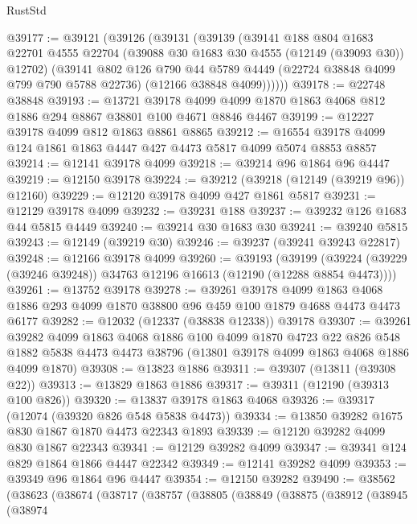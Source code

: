 \begin{lexlean}{RustStd}
\begin{coremodule}
@39177 := @39121
    (@39126
      (@39131
        (@39139
          (@39141
            @188
            @804
            @1683
            @22701
            @4555
            @22704
            (@39088 @30 @1683 @30 @4555 (@12149 (@39093 @30)) @12702)
            (@39141
              @802
              @126
              @790
              @44
              @5789
              @4449
              (@22724 @38848 @4099 @799 @790 @5788 @22736)
              (@12166 @38848 @4099))))))
@39178 := @22748 @38848
@39193 := @13721
    @39178
    @4099
    @4099
    @1870
    @1863
    @4068
    @812
    @1886
    @294
    @8867
    @38801
    @100
    @4671
    @8846
    @4467
@39199 := @12227 @39178 @4099 @812 @1863 @8861 @8865
@39212 := @16554 @39178 @4099 @124 @1861 @1863 @4447 @427 @4473 @5817 @4099 @5074 @8853 @8857
@39214 := @12141 @39178 @4099
@39218 := @39214 @96 @1864 @96 @4447
@39219 := @12150 @39178
@39224 := @39212 (@39218 (@12149 (@39219 @96)) @12160)
@39229 := @12120 @39178 @4099 @427 @1861 @5817
@39231 := @12129 @39178 @4099
@39232 := @39231 @188
@39237 := @39232 @126 @1683 @44 @5815 @4449
@39240 := @39214 @30 @1683 @30
@39241 := @39240 @5815
@39243 := @12149 (@39219 @30)
@39246 := @39237 (@39241 @39243 @22817)
@39248 := @12166 @39178 @4099
@39260 := @39193
    (@39199 (@39224 (@39229 (@39246 @39248)) @34763 @12196 @16613 (@12190 (@12288 @8854 @4473))))
@39261 := @13752 @39178
@39278 := @39261
    @39178
    @4099
    @1863
    @4068
    @1886
    @293
    @4099
    @1870
    @38800
    @96
    @459
    @100
    @1879
    @4688
    @4473
    @4473
    @6177
@39282 := @12032 (@12337 (@38838 @12338)) @39178
@39307 := @39261
    @39282
    @4099
    @1863
    @4068
    @1886
    @100
    @4099
    @1870
    @4723
    @22
    @826
    @548
    @1882
    @5838
    @4473
    @4473
    @38796
    (@13801 @39178 @4099 @1863 @4068 @1886 @4099 @1870)
@39308 := @13823 @1886
@39311 := @39307 (@13811 (@39308 @22))
@39313 := @13829 @1863 @1886
@39317 := @39311 (@12190 (@39313 @100 @826))
@39320 := @13837 @39178 @1863 @4068
@39326 := @39317 (@12074 (@39320 @826 @548 @5838 @4473))
@39334 := @13850 @39282 @1675 @830 @1867 @1870 @4473 @22343 @1893
@39339 := @12120 @39282 @4099 @830 @1867 @22343
@39341 := @12129 @39282 @4099
@39347 := @39341 @124 @829 @1864 @1866 @4447 @22342
@39349 := @12141 @39282 @4099
@39353 := @39349 @96 @1864 @96 @4447
@39354 := @12150 @39282
@39490 := @38562
    (@38623
      (@38674
        (@38717
          (@38757
            (@38805
              (@38849
                (@38875
                  (@38912
                    (@38945
                      (@38974

\end{coremodule}
\end{lexlean}
